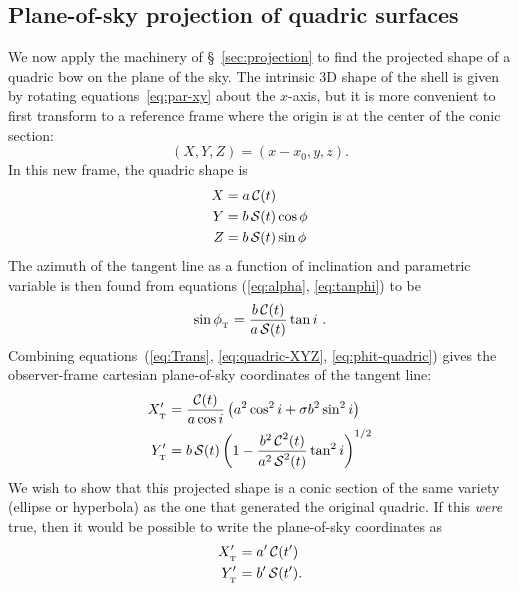 \subsection{Plane-of-sky projection of quadric surfaces} 

We now apply the machinery of \S~\ref{sec:projection} to find the
projected shape of a quadric bow on the plane of the sky.  The
intrinsic 3D shape of the shell is given by rotating
equations~\eqref{eq:par-xy} about the \(x\)-axis, but it is more
convenient to first transform to a reference frame where the origin is
at the center of the conic section:
\begin{equation}
  \label{eq:xyz-XYZ}
  (X, Y, Z) = (x - x_0, y, z) . 
\end{equation}
In this new frame, the quadric shape is
\begin{gather}
  \label{eq:quadric-XYZ}
  \begin{aligned}
    X &= a\operatorname{\mathcal{C}}(t) \\ 
    Y &= b \operatorname{\mathcal{S}}(t)\cos\phi \\
    Z &= b \operatorname{\mathcal{S}}(t)\sin\phi
  \end{aligned}
\end{gather}
The azimuth of the tangent line as a function of inclination and
parametric variable is then found from equations (\ref{eq:alpha},
\ref{eq:tanphi}) to be
\begin{equation}
  \label{eq:phit-quadric}
  \sin\phi_{_{\mathrm{\scriptscriptstyle T}}} = \frac{b \operatorname{\mathcal{C}}(t)} {a \operatorname{\mathcal{S}}(t)} \tan i \ .
\end{equation}
Combining equations~(\ref{eq:Trans}, \ref{eq:quadric-XYZ},
\ref{eq:phit-quadric}) gives the observer-frame cartesian
plane-of-sky coordinates of the tangent line:
\begin{gather}
  \label{eq:conic-projected-XY}
  \begin{aligned}
    X_{_{\mathrm{\scriptscriptstyle T}}}' & = \frac{\operatorname{\mathcal{C}}(t)}{a\cos i}
    \left(a^2\cos^2 i + \sigma b^2\sin^2 i\right)
    \\
    Y_{_{\mathrm{\scriptscriptstyle T}}}' &= b\operatorname{\mathcal{S}}(t)
    \left(
      1 - \frac{b^2 \operatorname{\mathcal{C}}^2(t)}{a^2 \operatorname{\mathcal{S}}^2(t)}
      \tan^2 i\right)^{1/2}
  \end{aligned}
\end{gather}
We wish to show that this projected shape is a conic section of the
same variety (ellipse or hyperbola) as the one that generated the
original quadric.  If this \emph{were} true, then it would be possible
to write the plane-of-sky coordinates as
\begin{gather}
  \begin{aligned}
    X_{_{\mathrm{\scriptscriptstyle T}}}' &= a'\operatorname{\mathcal{C}}( t')  \\
    Y_{_{\mathrm{\scriptscriptstyle T}}}' &= b'\operatorname{\mathcal{S}} (t')  . 
  \end{aligned}\label{eq:conic-projected-XY-conic}
\end{gather}
